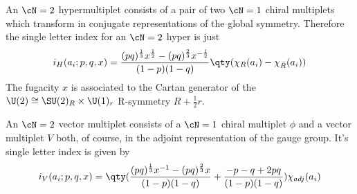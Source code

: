 An $\cN=2$ hypermultiplet consists of a pair of two $\cN=1$ chiral multiplets which transform in conjugate representations of the global symmetry. Therefore the single letter index for an $\cN=2$ hyper is just
\begin{equation}
	i_{H}(a_{i};p,q,x)=\frac{(pq)^{\frac{1}{3}}x^{\frac{1}{2}}-(pq)^{\frac{2}{3}}x^{-\frac{1}{2}}}{(1-p)(1-q)}\qty(\chi_{R}(a_{i})-\chi_{\bar{R}}(a_{i}))
\end{equation}
The fugacity $x$ is associated to the Cartan generator of the $\U(2)\cong\SU(2)_{R}\times \U(1)_{r}$ R-symmetry $R+\frac{1}{2}r$.

An $\cN=2$ vector multiplet consists of a $\cN=1$ chiral multiplet $\phi$ and a vector multiplet $V$ both, of course, in the adjoint representation of the gauge group. It's single letter index is given by
\begin{equation}
	i_{V}(a_{i};p,q,x)=\qty(\frac{(pq)^{\frac{1}{3}}x^{-1}-(pq)^{\frac{2}{3}}x}{(1-p)(1-q)}+\frac{-p-q+2pq}{(1-p)(1-q)})\chi_{adj}(a_{i})
\end{equation}

